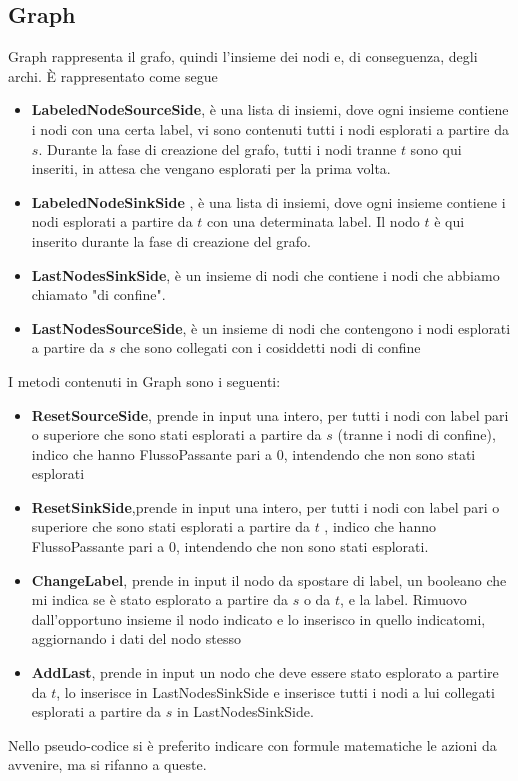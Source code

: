 \documentclass{article}
\begin{document}
\subsection{Graph}
Graph rappresenta il grafo, quindi l'insieme dei nodi e, di conseguenza, degli archi.
È rappresentato come segue
\begin{itemize}
    \item \textbf{LabeledNodeSourceSide}, è una lista di insiemi, dove ogni insieme contiene i nodi con una certa label, vi sono contenuti tutti i nodi esplorati a partire da $s$. Durante la fase di creazione del grafo, tutti i nodi tranne $t$ sono qui inseriti, in attesa che vengano esplorati per la prima volta.
    \item \textbf{LabeledNodeSinkSide} , è una lista di insiemi, dove ogni insieme contiene i nodi esplorati a partire da $t$ con una determinata label. Il nodo $t$ è qui inserito durante la fase di creazione del grafo.
    \item \textbf{LastNodesSinkSide}, è un insieme di nodi che contiene i nodi che abbiamo chiamato "di confine".
    \item \textbf{LastNodesSourceSide}, è un insieme di nodi che contengono i nodi esplorati a partire da $s$ che sono collegati con i cosiddetti nodi di confine
\end{itemize}
I metodi contenuti in Graph sono i seguenti:
\begin{itemize}
    \item \textbf{ResetSourceSide}, prende in input una intero, per tutti i nodi con label pari o superiore che sono stati esplorati a partire da $s$ (tranne i nodi di confine), indico che hanno FlussoPassante pari a 0, intendendo che non sono stati esplorati
    \item \textbf{ResetSinkSide},prende in input una intero, per tutti i nodi con label pari o superiore che sono stati esplorati a partire da $t$ , indico che hanno FlussoPassante pari a 0, intendendo che non sono stati esplorati.
    \item \textbf{ChangeLabel}, prende in input il nodo da spostare di label, un booleano che mi indica se è stato esplorato a partire da $s$ o da $t$, e la label. Rimuovo dall'opportuno insieme il nodo indicato e lo inserisco in quello indicatomi, aggiornando i dati del nodo stesso
    \item \textbf{AddLast}, prende in input un nodo che deve essere stato esplorato a partire da $t$, lo inserisce in LastNodesSinkSide e inserisce tutti i nodi a lui collegati esplorati a partire da $s$ in LastNodesSinkSide.
\end{itemize}
Nello pseudo-codice si è preferito indicare con formule matematiche le azioni da avvenire, ma si rifanno a queste.
\end{document}
